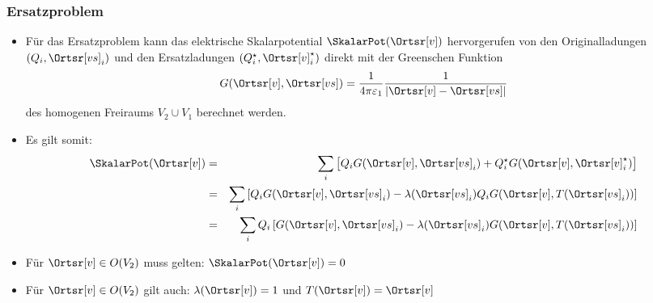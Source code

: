   \begin{frame}
    \frametitle{Ersatzproblem}
    \begin{itemize}[<+->]
    \item Für das \alert{Ersatzproblem} kann das elektrische Skalarpotential $\SkalarPot(\Ortsr[v])$ hervorgerufen von den \alert{Originalladungen} $(Q_i, \Ortsr[vs]_i)$ und den \alert{Ersatzladungen} $(Q_i^\star, \Ortsr[v]_i^\star)$ direkt mit der \alert{Greenschen Funktion}
      \begin{equation*}
        G(\Ortsr[v],\Ortsr[vs]) = \frac{1}{4\pi\varepsilon_1} \frac{1}{\left|\Ortsr[v] - \Ortsr[vs] \right|}
      \end{equation*}
      des homogenen Freiraums $V_2\cup V_1$ berechnet werden.
    \item Es gilt somit:
      \begin{eqnarray*}
        \SkalarPot(\Ortsr[v]) & = &\sum_i \left[ Q_i G(\Ortsr[v],\Ortsr[vs]_i) + Q_i^\star G(\Ortsr[v],\Ortsr[v]_i^\star)\right]\\
                                     & = &  \sum_i \left[ Q_i G(\Ortsr[v],\Ortsr[vs]_i) -\lambda(\Ortsr[vs]_i) Q_i G(\Ortsr[v],T(\Ortsr[vs]_i))\right]\\
                                     & = & \sum_i Q_i \left[G(\Ortsr[v],\Ortsr[vs]_i) -\lambda(\Ortsr[vs]_i) G(\Ortsr[v],T(\Ortsr[vs]_i))\right]
      \end{eqnarray*}
      \item Für $\Ortsr[v] \in O(V_2)$ muss gelten: $\SkalarPot(\Ortsr[v]) = 0$
      \item Für $\Ortsr[v] \in O(V_2)$ gilt auch: $\lambda(\Ortsr[v]) = 1$ und $T(\Ortsr[v]) = \Ortsr[v]$ 
 \end{itemize}   
    
    \end{frame}

